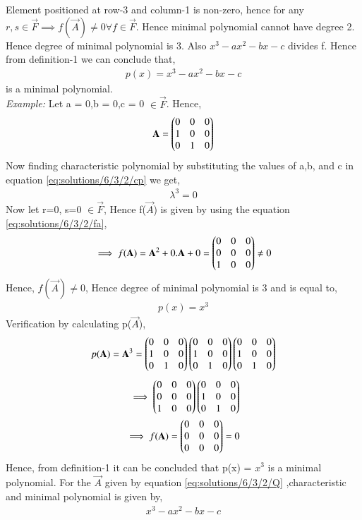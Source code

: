 Element positioned at row-3 and column-1 is non-zero, hence for any $r,s \in \vec{F} \implies f(\vec{A})\neq 0  \forall f \in \vec{F}$. Hence minimal polynomial cannot have degree 2. Hence degree of minimal polynomial is 3. Also $x^3-ax^2-bx-c$ divides f. Hence from definition-1 we can conclude that,
\begin{align}
p(x) = x^3-ax^2-bx-c
\end{align} 
is a minimal polynomial.
\\
{\em Example: }
Let a = 0,b = 0,c = 0 $\in \vec{F}$. Hence,
\begin{align}
\mathbf{A} = \begin{pmatrix}0&0&0\\1&0&0\\0&1&0\end{pmatrix}
\end{align}
Now finding characteristic polynomial by substituting the values of a,b, and c in equation \eqref{eq:solutions/6/3/2/cp} we get,
\begin{align}
\lambda^3 = 0
\end{align}
Now let r=0, s=0 $\in \vec{F}$,
Hence f($\vec{A}$) is given by using the equation \eqref{eq:solutions/6/3/2/fa},
\begin{align}
\implies f(\mathbf{A}) = \mathbf{A}^2+0.\mathbf{A}+0 = \begin{pmatrix}0&0&0\\0&0&0\\1&0&0\end{pmatrix} \neq 0
\end{align}
Hence, $f(\vec{A})\neq 0$, Hence degree of minimal polynomial is 3 and is equal to,
\begin{align}
p(x) = x^3
\end{align}
Verification by calculating p($\vec{A}$),
\begin{align}
p(\mathbf{A}) = \mathbf{A}^3 = \begin{pmatrix}0&0&0\\1&0&0\\0&1&0\end{pmatrix}\begin{pmatrix}0&0&0\\1&0&0\\0&1&0\end{pmatrix}\begin{pmatrix}0&0&0\\1&0&0\\0&1&0\end{pmatrix}
\end{align}
\begin{align}
\implies \begin{pmatrix}0&0&0\\0&0&0\\1&0&0\end{pmatrix}\begin{pmatrix}0&0&0\\1&0&0\\0&1&0\end{pmatrix}\\
\implies f(\mathbf{A}) = \begin{pmatrix}0&0&0\\0&0&0\\0&0&0\end{pmatrix} = 0
\end{align}
Hence, from definition-1 it can be concluded that p(x) = $x^3$ is a minimal polynomial.
For the $\vec{A}$ given by equation \eqref{eq:solutions/6/3/2/Q} ,characteristic and minimal polynomial is given by,
\begin{align}
x^3-ax^2-bx-c
\end{align}
